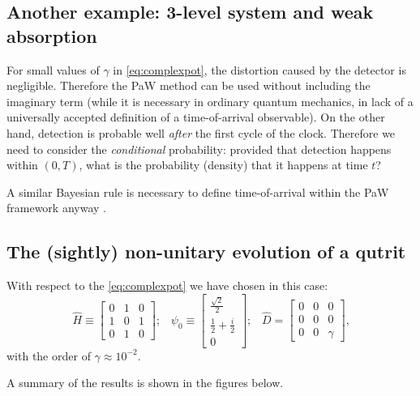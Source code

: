 \documentclass[a0,landscape]{a0poster}
\DeclareMathOperator*{\repr}{\equiv}      %
\begin{document}
\begin{multicols}{3}
\section*{Another example: 3-level system and weak absorption}

For small values of $\gamma$ in \eqref{eq:complexpot},
the distortion caused by the detector is negligible.
Therefore the PaW method can be used without including the imaginary term
(while it is necessary in ordinary quantum mechanics,
in lack of a universally accepted definition of a time-of-arrival observable).
On the other hand, detection is probable well \emph{after} the first cycle of the clock.
Therefore we need to consider the \emph{conditional} probability: provided that detection happens
within $(0, T)$, what is the probability (density) that it happens at time $t$?

A similar Bayesian rule is necessary to define time-of-arrival within the PaW framework
anyway \cite{Maccone:QMOT}.

\subsection*{The (sightly) non-unitary evolution of a qutrit}
With respect to the \eqref{eq:complexpot} we have chosen in this case:
\begin{equation}
  \hat{H} \repr \left[\begin{matrix}0 & 1 & 0\\1 & 0 & 1\\0 & 1 & 0\end{matrix}\right] \text{;} \quad
  \psi_0 \repr \left[\begin{matrix}\frac{\sqrt{2}}{2}\\\frac{1}{2} + \frac{i}{2}\\0\end{matrix}\right] \text{;} \quad
  \hat{D} = \left[\begin{matrix}0 & 0 & 0\\0 & 0 & 0\\0 & 0 & \gamma\end{matrix}\right] \text{,}
\end{equation}
with the order of $\gamma \approx 10^{-2}$.

A summary of the results is shown in the figures below.
\vspace{0.5cm}


\end{multicols}
\end{document}
